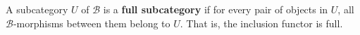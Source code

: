 A subcategory $U$ of $\mathcal{B}$ is a \textbf{full subcategory} if for every pair of objects in $U$, all $\mathcal{B}$-morphisms between them belong to $U$. That is, the inclusion functor is full.
